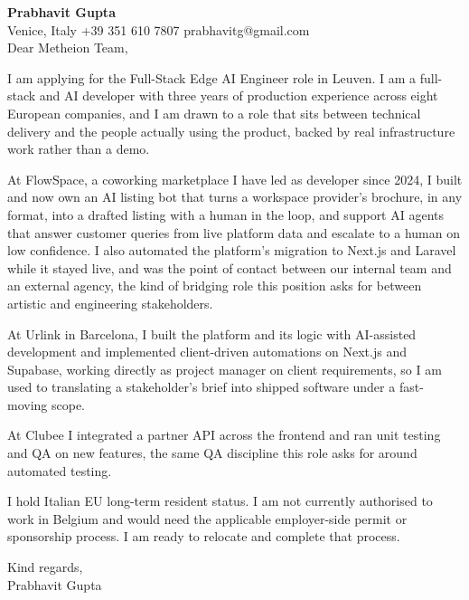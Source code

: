 \documentclass[a4paper,10.5pt]{article}
\begin{document}
\textbf{Prabhavit Gupta}\\
Venice, Italy \textbar{} +39 351 610 7807 \textbar{} prabhavitg@gmail.com\\[10pt]
Dear Metheion Team,

I am applying for the Full-Stack Edge AI Engineer role in Leuven. I am a full-stack and AI developer with three years of production experience across eight European companies, and I am drawn to a role that sits between technical delivery and the people actually using the product, backed by real infrastructure work rather than a demo.

At FlowSpace, a coworking marketplace I have led as developer since 2024, I built and now own an AI listing bot that turns a workspace provider's brochure, in any format, into a drafted listing with a human in the loop, and support AI agents that answer customer queries from live platform data and escalate to a human on low confidence. I also automated the platform's migration to Next.js and Laravel while it stayed live, and was the point of contact between our internal team and an external agency, the kind of bridging role this position asks for between artistic and engineering stakeholders.

At Urlink in Barcelona, I built the platform and its logic with AI-assisted development and implemented client-driven automations on Next.js and Supabase, working directly as project manager on client requirements, so I am used to translating a stakeholder's brief into shipped software under a fast-moving scope.

At Clubee I integrated a partner API across the frontend and ran unit testing and QA on new features, the same QA discipline this role asks for around automated testing.

I hold Italian EU long-term resident status. I am not currently authorised to work in Belgium and would need the applicable employer-side permit or sponsorship process. I am ready to relocate and complete that process.

Kind regards,\\
Prabhavit Gupta
\end{document}
